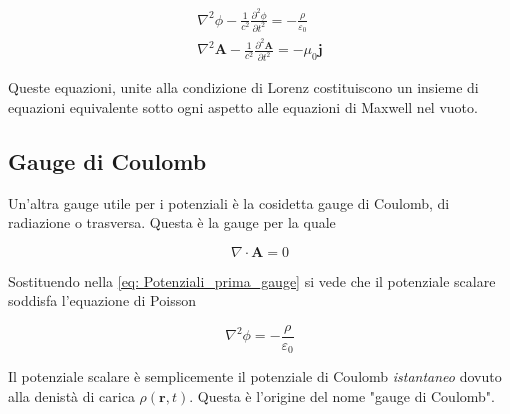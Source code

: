 \begin{tcolorbox}[colback=yellow!10!white, colframe=orange!70!black, boxrule=0.8pt]
\begin{align} \label{eq: Gauge_Lorenz}
    \nabla^2 \phi - \frac{1}{c^2} \frac{\partial^2 \phi}{\partial t^2} = - \frac{\rho}{\varepsilon_0} \\
    \nabla^2 \mathbf{A} - \frac{1}{c^2} \frac{\partial^2 \mathbf{A}}{\partial t^2} = -\mu_0 \mathbf{j}
\end{align}
\end{tcolorbox}

Queste equazioni, unite alla condizione di Lorenz costituiscono un insieme di equazioni equivalente sotto ogni aspetto alle equazioni di Maxwell nel vuoto. 

\subsection{Gauge di Coulomb}

Un'altra gauge utile per i potenziali è la cosidetta gauge di Coulomb, di radiazione o trasversa. Questa è la gauge per la quale 

\begin{equation}
    \nabla \cdot \mathbf{A} = 0
\end{equation}

Sostituendo nella \ref{eq: Potenziali_prima_gauge} si vede che il potenziale scalare soddisfa l'equazione di Poisson

\begin{equation}
    \nabla^2 \phi = -\frac{\rho}{\varepsilon_0}
\end{equation}

Il potenziale scalare è semplicemente il potenziale di Coulomb \emph{istantaneo} dovuto alla denistà di carica $\rho(\mathbf{r}, t)$. Questa è l'origine del nome "gauge di Coulomb".